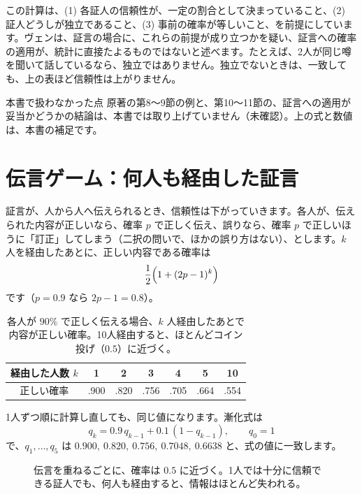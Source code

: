 \documentclass[a4paper,11pt,openany]{ltjsbook}
\begin{document}
この計算は、(1) 各証人の信頼性が、一定の割合として決まっていること、(2) 証人どうしが独立であること、(3) 事前の確率が等しいこと、を前提にしています。ヴェンは、証言の場合に、これらの前提が成り立つかを疑い、証言への確率の適用が、統計に直接たよるものではないと述べます。たとえば、2人が同じ噂を聞いて話しているなら、独立ではありません。独立でないときは、一致しても、上の表ほど信頼性は上がりません。

\begin{notebox}{本書で扱わなかった点}
原著の第8〜9節の例と、第10〜11節の、証言への適用が妥当かどうかの結論は、本書では取り上げていません（未確認）。上の式と数値は、本書の補足です。
\end{notebox}

\section{伝言ゲーム：何人も経由した証言}

証言が、人から人へ伝えられるとき、信頼性は下がっていきます。各人が、伝えられた内容が正しいなら、確率 $p$ で正しく伝え、誤りなら、確率 $p$ で正しいほうに「訂正」してしまう（二択の問いで、ほかの誤り方はない）、とします。$k$ 人を経由したあとに、正しい内容である確率は
\[
\frac12\Bigl(1+(2p-1)^k\Bigr)
\]
です（$p=0.9$ なら $2p-1=0.8$）。

\begin{table}[htbp]
\centering
\begin{tabular}{c|cccccc}
\toprule
経由した人数 $k$ & 1 & 2 & 3 & 4 & 5 & 10\\
\midrule
正しい確率 & .900 & .820 & .756 & .705 & .664 & .554\\
\bottomrule
\end{tabular}
\caption{各人が $90\%$ で正しく伝える場合、$k$ 人経由したあとで内容が正しい確率。10人経由すると、ほとんどコイン投げ（$0.5$）に近づく。}
\end{table}

1人ずつ順に計算し直しても、同じ値になります。漸化式は
\[
q_k=0.9\,q_{k-1}+0.1\,(1-q_{k-1}),\qquad q_0=1
\]
で、$q_1,\ldots,q_5$ は $0.900,\ 0.820,\ 0.756,\ 0.7048,\ 0.6638$ と、式の値に一致します。

\begin{figure}[htbp]
\centering
{}
\caption{伝言を重ねるごとに、確率は $0.5$ に近づく。1人では十分に信頼できる証人でも、何人も経由すると、情報はほとんど失われる。}
\end{figure}
\end{document}
